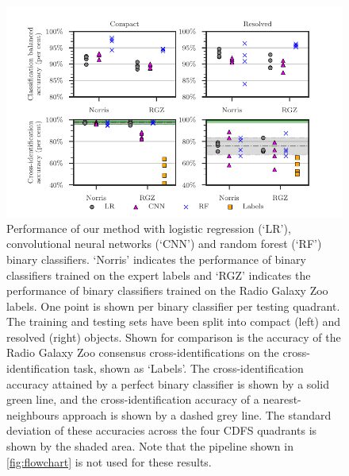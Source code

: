     \begin{figure}
    \centering
    \includegraphics[width=1.0\linewidth]{atlas-images/cdfs-grid-new.pdf}
    \caption[Performance of our method with different binary classifiers on the binary classification task.]{Performance of our method with logistic regression (`LR'), convolutional neural networks (`CNN') and random forest (`RF') binary classifiers. `Norris' indicates the performance of binary classifiers trained on the expert labels and `RGZ' indicates the performance of binary classifiers trained on the Radio Galaxy Zoo labels. One point is shown per binary classifier per testing quadrant. The training and testing sets have been split into compact (left) and resolved (right) objects. {Shown for comparison is the accuracy of the Radio Galaxy Zoo consensus cross-identifications on the cross-identification task, shown as `Labels'.} The cross-identification accuracy attained by a perfect binary classifier is shown by a solid green line, and the cross-identification accuracy of a nearest-neighbours approach is shown by a dashed grey line. The standard deviation of these accuracies across the four CDFS quadrants is shown by the shaded area. Note that the pipeline shown in \autoref{fig:flowchart} is not used for these results. \label{fig:ba}}
    \end{figure}

